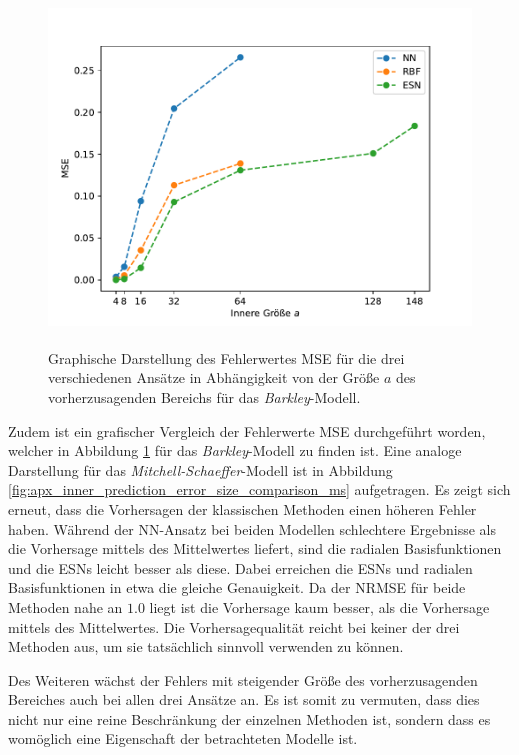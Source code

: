 \begin{figure}[H]
	\centering
	\includegraphics[height=3.7in]{figures/results/inner_cross_prediction/barkley_error_size_comparison.pdf}
	\caption{Graphische Darstellung des Fehlerwertes MSE für die drei verschiedenen Ansätze in Abhängigkeit von der Größe $a$ des vorherzusagenden Bereichs für das \textit{Barkley}-Modell.}
	\label{fig:inner_prediction_error_size_comparison_barkley}
\end{figure}
 
Zudem ist ein grafischer Vergleich der Fehlerwerte MSE durchgeführt worden, welcher in Abbildung \ref{fig:inner_prediction_error_size_comparison_barkley} für das \textit{Barkley}-Modell zu finden ist. Eine analoge Darstellung für das \textit{Mitchell-Schaeffer}-Modell ist in Abbildung \ref{fig:apx_inner_prediction_error_size_comparison_ms} aufgetragen. Es zeigt sich erneut, dass die Vorhersagen der klassischen Methoden einen höheren Fehler haben. Während der \textsc{NN}-Ansatz bei beiden Modellen schlechtere Ergebnisse als die Vorhersage mittels des Mittelwertes liefert, sind die radialen Basisfunktionen und die \textsc{ESN}s leicht besser als diese. Dabei erreichen die \textsc{ESN}s und radialen Basisfunktionen in etwa die gleiche Genauigkeit. Da der NRMSE für beide Methoden nahe an $1.0$ liegt ist die Vorhersage kaum besser, als die Vorhersage mittels des Mittelwertes. Die Vorhersagequalität reicht bei keiner der drei Methoden aus, um sie tatsächlich sinnvoll verwenden zu können. 

Des Weiteren wächst der Fehlers mit steigender Größe des vorherzusagenden Bereiches auch bei allen drei Ansätze an. Es ist somit zu vermuten, dass dies nicht nur eine reine Beschränkung der einzelnen Methoden ist, sondern dass es womöglich eine Eigenschaft der betrachteten Modelle ist. 

